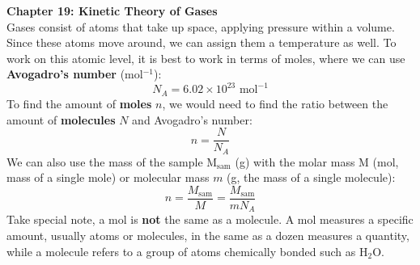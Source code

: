 \documentclass[11pt]{article}
\begin{document}
    \noindent \textbf{Chapter 19: Kinetic Theory of Gases}
    \\ \noindent \newline Gases consist of atoms that take up space, applying pressure within a volume.
    Since these atoms move around, we can assign them a temperature as well.
    To work on this atomic level, it is best to work in terms of moles,
    where we can use \textbf{Avogadro's number} (mol$^{-1}$):
    \begin{equation}
        N_A = 6.02 \times 10^{23} \text{ mol}^{-1} \tag{Avogadro's number}
        \end{equation}
    \noindent To find the amount of \textbf{moles} $n$, we would need to find the ratio
    between the amount of \textbf{molecules} $N$ and Avogadro's number:
    \begin{equation}
       n = \frac{N}{N_A} \tag{moles}
    \end{equation}
    \noindent We can also use the mass of the sample M$_{\text{sam}}$ (g)
    with the molar mass M (mol, mass of a single mole) or molecular mass $m$ (g, the mass of a single molecule):
    \begin{equation}
        n = \frac{M_{\text{sam}}}{M} = \frac{M_{\text{sam}}}{mN_A} \tag{moles}
    \end{equation}
    \noindent Take special note, a mol is \textbf{not} the same as a molecule.
    A mol measures a specific amount, usually atoms or molecules, in the same as a dozen measures a quantity,
    while a molecule refers to a group of atoms chemically bonded such as H$_2$O.
\end{document}
